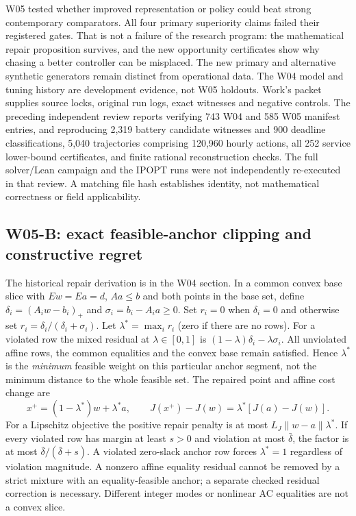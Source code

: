 \documentclass[11pt,letterpaper]{article}
\begin{document}
W05 tested whether improved representation or policy could beat strong contemporary comparators. All four primary superiority claims failed their registered gates. That is not a failure of the research program: the mathematical repair proposition survives, and the new opportunity certificates show why chasing a better controller can be misplaced. The new primary and alternative synthetic generators remain distinct from operational data. The W04 model and tuning history are development evidence, not W05 holdouts. Work's packet supplies source locks, original run logs, exact witnesses and negative controls. The preceding independent review reports verifying 743 W04 and 585 W05 manifest entries, and reproducing 2,319 battery candidate witnesses and 900 deadline classifications, 5,040 trajectories comprising 120,960 hourly actions, all 252 service lower-bound certificates, and finite rational reconstruction checks. The full solver/Lean campaign and the IPOPT runs were not independently re-executed in that review. A matching file hash establishes identity, not mathematical correctness or field applicability.

\subsection{W05-B: exact feasible-anchor clipping and constructive regret}
The historical repair derivation is in the W04 section. In a common convex base slice with $Ew=Ea=d$, $Aa\le b$ and both points in the base set, define $\delta_i=(A_iw-b_i)_+$ and $\sigma_i=b_i-A_ia\ge0$. Set $r_i=0$ when $\delta_i=0$ and otherwise set $r_i=\delta_i/(\delta_i+\sigma_i)$. Let $\lambda^*=\max_i r_i$ (zero if there are no rows). For a violated row the mixed residual at $\lambda\in[0,1]$ is $(1-\lambda)\delta_i-\lambda\sigma_i$. All unviolated affine rows, the common equalities and the convex base remain satisfied. Hence $\lambda^*$ is the \emph{minimum} feasible weight on this particular anchor segment, not the minimum distance to the whole feasible set. The repaired point and affine cost change are
\begin{equation}
 x^+=(1-\lambda^*)w+\lambda^*a,\qquad J(x^+)-J(w)=\lambda^*[J(a)-J(w)].
\end{equation}
For a Lipschitz objective the positive repair penalty is at most $L_J\|w-a\|\lambda^*$. If every violated row has margin at least $s>0$ and violation at most $\bar\delta$, the factor is at most $\bar\delta/(\bar\delta+s)$. A violated zero-slack anchor row forces $\lambda^*=1$ regardless of violation magnitude. A nonzero affine equality residual cannot be removed by a strict mixture with an equality-feasible anchor; a separate checked residual correction is necessary. Different integer modes or nonlinear AC equalities are not a convex slice.
\end{document}
